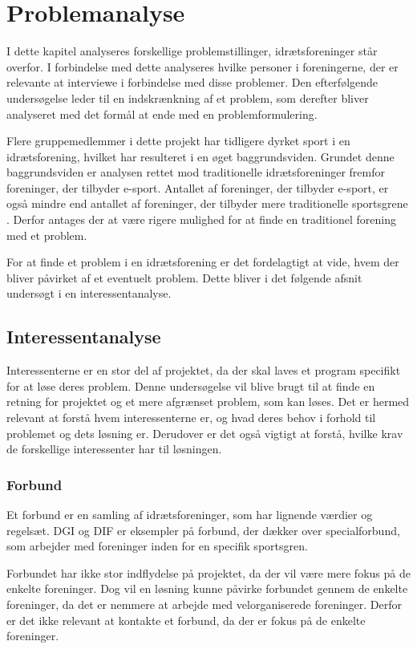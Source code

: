 \chapter{Problemanalyse}\label{ch:ch2label}
I dette kapitel analyseres forskellige problemstillinger, idrætsforeninger står overfor. I forbindelse med dette analyseres hvilke personer i foreningerne, der er relevante at interviewe i forbindelse med disse problemer. Den efterfølgende undersøgelse leder til en indskrænkning af et problem, som derefter bliver analyseret med det formål at ende med en problemformulering.
\par
Flere gruppemedlemmer i dette projekt har tidligere dyrket sport i en idrætsforening, hvilket har resulteret i en øget baggrundsviden. Grundet denne baggrundsviden er analysen rettet mod traditionelle idrætsforeninger fremfor foreninger, der tilbyder e-sport. Antallet af foreninger, der tilbyder e-sport, er også mindre end antallet af foreninger, der tilbyder mere traditionelle sportsgrene \citep{e-sport}. Derfor antages der at være rigere mulighed for at finde en traditionel forening med et problem.
\par
For at finde et problem i en idrætsforening er det fordelagtigt at vide, hvem der bliver påvirket af et eventuelt problem. Dette bliver i det følgende afsnit undersøgt i en interessentanalyse. 
\newpage
\section{Interessentanalyse}
Interessenterne er en stor del af projektet, da der skal laves et program specifikt for at løse deres problem. Denne undersøgelse vil blive brugt til at finde en retning for projektet og et mere afgrænset problem, som kan løses. Det er hermed relevant at forstå hvem interessenterne er, og hvad deres behov i forhold til problemet og dets løsning er. Derudover er det også vigtigt at forstå, hvilke krav de forskellige interessenter har til løsningen.

\subsection*{Forbund}
Et forbund er en samling af idrætsforeninger, som har lignende værdier og regelsæt. DGI og DIF er eksempler på forbund, der dækker over specialforbund, som arbejder med foreninger inden for en specifik sportsgren.
\par
Forbundet har ikke stor indflydelse på projektet, da der vil være mere fokus på de enkelte foreninger. Dog vil en løsning kunne påvirke forbundet gennem de enkelte foreninger, da det er nemmere at arbejde med velorganiserede foreninger. Derfor er det ikke relevant at kontakte et forbund, da der er fokus på de enkelte foreninger. 

